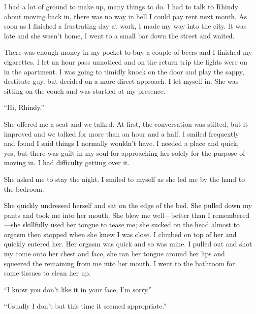 I had a lot of ground to make up, many things to do. I had to talk to
Rhindy about moving back in, there was no way in hell I could pay rent
next month. As soon as I finished a frustrating day at work, I made my
way into the city. It was late and she wasn't home, I went to a small
bar down the street and waited.

There was enough money in my pocket to buy a couple of beers and I
finished my cigarettes. I let an hour pass unnoticed and on the return
trip the lights were on in the apartment. I was going to timidly knock
on the door and play the sappy, destitute guy, but decided on a more
direct approach. I let myself in. She was sitting on the couch and was
startled at my presence.

``Hi, Rhindy.''

She offered me a seat and we talked. At first, the conversation was
stilted, but it improved and we talked for more than an hour and a half.
I smiled frequently and found I said things I normally wouldn't have. I
needed a place and quick, yes, but there was guilt in my soul for
approaching her solely for the purpose of moving in. I had difficulty
getting over it.

She asked me to stay the night. I smiled to myself as she led me by the
hand to the bedroom.

She quickly undressed herself and sat on the edge of the bed. She pulled
down my pants and took me into her mouth. She blew me well---better than
I remembered---she skillfully used her tongue to tease me; she sucked on
the head almost to orgasm then stopped when she knew I was close. I
climbed on top of her and quickly entered her. Her orgasm was quick and
so was mine. I pulled out and shot my come onto her chest and face, she
ran her tongue around her lips and squeezed the remaining from me into
her mouth. I went to the bathroom for some tissues to clean her up.

``I know you don't like it in your face, I'm sorry.''

``Usually I don't but this time it seemed appropriate.''

